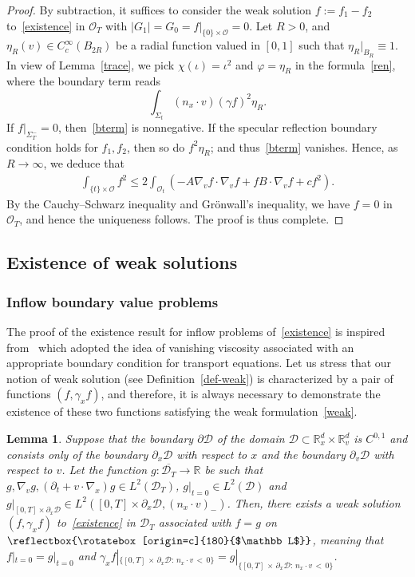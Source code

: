 \documentclass[10pt]{amsart}
\newtheorem{lemm}[theo]{Lemma}\newtheorem{prop}[theo]{Proposition}\newtheorem{coro}[theo]{Corollary}\newtheorem{conj}[theo]{Conjecture}
\theoremstyle{definition}\newtheorem{defi}[theo]{Definition}\newtheorem{rema}[theo]{Remark}\newtheorem{exam}[theo]{Example}\newtheorem{exem}[theo]{Example}\newtheorem{nota}[theo]{Notation}
\newcommand*\p{\partial}
\newcommand*\R {\mathbb{R}}
\newcommand*\D {\mathcal{D}}
\newcommand*\OO {\mathcal{O}}
\newcommand\GG{\reflectbox{\rotatebox[origin=c]{180}{$\mathbb L$}}}
\begin{document}
\begin{proof}
By subtraction, it suffices to consider the weak solution $f:=f_1-f_2$ to~\eqref{existence} in $\OO_T$ with $|G_1|=G_0=f|_{\{0\}\times\OO}=0$. Let $R>0$, and $\eta_R(v)\in C_c^\infty(B_{2R})$ be a radial function valued in $[0,1]$ such that $\eta_R|_{B_R}\equiv1$. In view of Lemma~\ref{trace}, we pick $\chi(\iota)=\iota^2$ and $\varphi=\eta_R$ in the formula~\eqref{ren}, where the boundary term reads
\begin{equation}\label{bterm}
\int_{\Sigma_t} (n_x\cdot v) (\gamma f)^2\eta_R.
\end{equation}
If $f|_{\Sigma_T^-}=0$, then~\eqref{bterm} is nonnegative. If the specular reflection boundary condition holds for $f_1,f_2$, then so do $f^2\eta_R$; and thus~\eqref{bterm} vanishes. Hence, as $R\rightarrow\infty$, we deduce that
\begin{align*}
\int_{\{t\}\times\OO}f^2 \le 2\int_{\OO_t}\left(-A\nabla_vf\cdot\nabla_vf +fB\cdot\nabla_vf +cf^2\right).
\end{align*}
By the Cauchy--Schwarz inequality and Gr\"onwall's inequality, we have $f=0$ in $\OO_T$, and hence the uniqueness follows. The proof is thus complete.
\end{proof}

\subsection{Existence of weak solutions}\label{EW}
\subsubsection{Inflow boundary value problems}\label{subinflow}


The proof of the existence result for inflow problems of~\eqref{existence} is inspired from~\cite{Boyer} which adopted the idea of vanishing viscosity associated with an appropriate boundary condition for transport equations. Let us stress that our notion of weak solution (see Definition~\ref{def-weak}) is characterized by a pair of functions $(f,\gamma_xf)$, and therefore, it is always necessary to demonstrate the existence of these two functions satisfying the weak formulation~\eqref{weak}.

\begin{lemm}\label{weakexistence}
Suppose that the boundary $\p\D$ of the domain $\D\subset\R^d_x\times\R^d_v$ is $C^{0,1}$ and consists only of the boundary $\p_x\D$ with respect to $x$ and the boundary $\p_v\D$ with respect to $v$. Let the function $g:\overline{\D_T}\rightarrow\R$ be such that $g,\nabla_vg,(\p_t+v\cdot\nabla_x)g\in L^2(\D_T)$, $g|_{t=0}\in L^2(\D)$ and $g|_{[0,T]\times\p_x\D}\in L^2([0,T]\times\p_x\D,(n_x\cdot v)_-)$. Then, there exists a weak solution $(f,\gamma_x f)$ to~\eqref{existence} in $\D_T$ associated with $f=g$ on $\GG$, meaning that $f|_{t=0}=g|_{t=0}$ and $\gamma_xf|_{\{[0,T]\,\times\,\p_x\D:\,n_x\cdot v\,<\,0\}}=g|_{\{[0,T]\,\times\,\p_x\D:\,n_x\cdot v\,<\,0\}}$.
\end{lemm}
\end{document}
